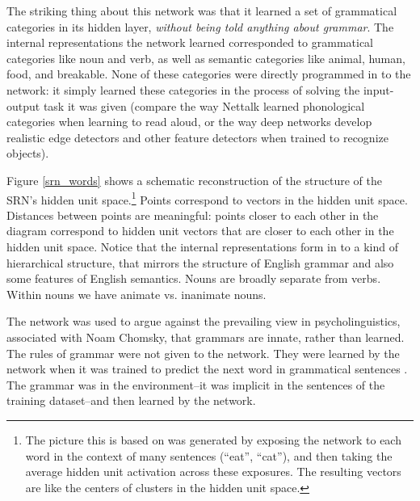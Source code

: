 The striking thing about this network was that it learned a set of grammatical categories in its hidden layer, \emph{without being told anything about grammar}. The internal representations the network learned corresponded to grammatical categories like noun and verb, as well as semantic categories like animal, human, food, and breakable. None of these categories were directly programmed in to the network: it simply learned these categories in the process of solving the input-output task it was given (compare the way Nettalk learned phonological categories when learning to read aloud, or the way deep networks develop realistic edge detectors and other feature detectors when trained to recognize objects). 

Figure \ref{srn_words} shows a schematic reconstruction of the structure of the SRN's hidden unit space.\footnote{The picture this is based on was generated by exposing the network to each word in the context of many sentences (\eg ``eat'', ``cat''), and then taking the average hidden unit activation across these exposures. The resulting vectors are like the centers of clusters in the hidden unit space.} Points correspond to vectors in the hidden unit space. Distances between points are meaningful: points closer to each other in the diagram correspond to hidden unit vectors that are closer to each other in the hidden unit space. Notice that the internal representations form in to a kind of hierarchical structure, that mirrors the structure of English grammar and also some features of English semantics. Nouns are broadly separate from verbs. Within nouns we have animate vs. inanimate nouns. 

The network was used to argue against the prevailing view in psycholinguistics, associated with Noam Chomsky,  that  grammars are innate, rather than learned. The rules of grammar were not given to the network. They were learned by the network when it was trained to predict the next word in grammatical sentences \cite{elman1990finding}. The grammar was in the environment--it was implicit in the sentences of the training dataset--and then learned by the network.

